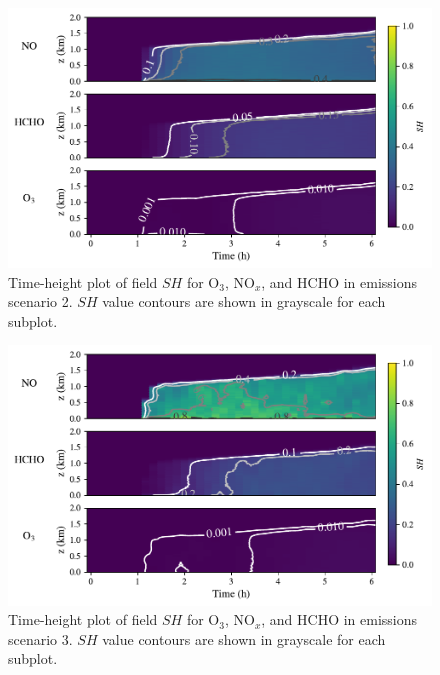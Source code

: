 \begin{figure}[h]
    \centering
    \includegraphics[width=.97\textwidth]{figures/chapter4/height-time-nsh-multivar-road-10x.pdf}
    \caption{Time-height plot of field $SH$ for O$_3$, NO$_x$, and HCHO in emissions scenario 2. $SH$ value contours are shown in grayscale for each subplot.}
    \label{fig:atmos-sh-s2}
\end{figure}

  \begin{figure}
    \centering
    \includegraphics[width=.97\textwidth]{figures/chapter4/height-time-nsh-multivar-point-source-1x1.pdf}
    \caption{Time-height plot of field $SH$ for O$_3$, NO$_x$, and HCHO in emissions scenario 3. $SH$ value contours are shown in grayscale for each subplot.}
    \label{fig:atmos-sh-s3}
 \end{figure}
 
